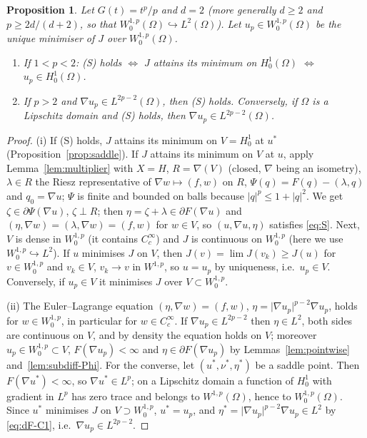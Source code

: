 \documentclass[11pt]{amsart}
\newtheorem{proposition}[theorem]{Proposition}
\theoremstyle{definition}
\theoremstyle{remark}
\numberwithin{equation}{section}
\newcommand{\abs}[1]{\lvert #1\rvert}
\begin{document}
\begin{proposition}\label{prop:S-p}
Let $G(t)=t^p/p$ and $d=2$ \textup(more generally $d\ge2$ and $p\ge2d/(d+2)$, so that $W^{1,p}_0(\Omega)\hookrightarrow L^2(\Omega)$\textup). Let $u_p\in W^{1,p}_0(\Omega)$ be the unique minimiser of $J$ over $W^{1,p}_0(\Omega)$.
\begin{enumerate}[label=\textup{(\roman*)}]
\item If $1<p<2$: \textup{(S)} holds $\iff$ $J$ attains its minimum on $H^1_0(\Omega)$ $\iff$ $u_p\in H^1_0(\Omega)$.
\item If $p>2$ and $\nabla u_p\in L^{2p-2}(\Omega)$, then \textup{(S)} holds. Conversely, if $\Omega$ is a Lipschitz domain and \textup{(S)} holds, then $\nabla u_p\in L^{2p-2}(\Omega)$.
\end{enumerate}
\end{proposition}
\begin{proof}
(i) If (S) holds, $J$ attains its minimum on $V=H^1_0$ at $u^*$ (Proposition~\ref{prop:saddle}). If $J$ attains its minimum on $V$ at $u$, apply Lemma~\ref{lem:multiplier} with $X=H$, $R=\nabla(V)$ (closed, $\nabla$ being an isometry), $\lambda\in R$ the Riesz representative of $\nabla w\mapsto(f,w)$ on $R$, $\Psi(q)=F(q)-(\lambda,q)$ and $q_0=\nabla u$; $\Psi$ is finite and bounded on balls because $\abs q^p\le1+\abs q^2$. We get $\zeta\in\partial\Psi(\nabla u)$, $\zeta\perp R$; then $\eta=\zeta+\lambda\in\partial F(\nabla u)$ and $(\eta,\nabla w)=(\lambda,\nabla w)=(f,w)$ for $w\in V$, so $(u,\nabla u,\eta)$ satisfies \eqref{eq:S}. Next, $V$ is dense in $W^{1,p}_0$ (it contains $C^\infty_c$) and $J$ is continuous on $W^{1,p}_0$ (here we use $W^{1,p}_0\hookrightarrow L^2$). If $u$ minimises $J$ on $V$, then $J(v)=\lim J(v_k)\ge J(u)$ for $v\in W^{1,p}_0$ and $v_k\in V$, $v_k\to v$ in $W^{1,p}$, so $u=u_p$ by uniqueness, i.e.\ $u_p\in V$. Conversely, if $u_p\in V$ it minimises $J$ over $V\subset W^{1,p}_0$.

(ii) The Euler--Lagrange equation $(\eta,\nabla w)=(f,w)$, $\eta=\abs{\nabla u_p}^{p-2}\nabla u_p$, holds for $w\in W^{1,p}_0$, in particular for $w\in C^\infty_c$. If $\nabla u_p\in L^{2p-2}$ then $\eta\in L^2$, both sides are continuous on $V$, and by density the equation holds on $V$; moreover $u_p\in W^{1,p}_0\subset V$, $F(\nabla u_p)<\infty$ and $\eta\in\partial F(\nabla u_p)$ by Lemmas~\ref{lem:pointwise} and~\ref{lem:subdiff-Phi}. For the converse, let $(u^*,\nu^*,\eta^*)$ be a saddle point. Then $F(\nabla u^*)<\infty$, so $\nabla u^*\in L^p$; on a Lipschitz domain a function of $H^1_0$ with gradient in $L^p$ has zero trace and belongs to $W^{1,p}(\Omega)$, hence to $W^{1,p}_0(\Omega)$. Since $u^*$ minimises $J$ on $V\supset W^{1,p}_0$, $u^*=u_p$, and $\eta^*=\abs{\nabla u_p}^{p-2}\nabla u_p\in L^2$ by \eqref{eq:dF-C1}, i.e.\ $\nabla u_p\in L^{2p-2}$.
\end{proof}
\end{document}
